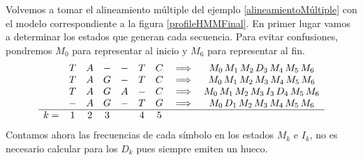 \begin{exampleth}
    Volvemos a tomar el alineamiento múltiple del ejemplo \ref{alineamientoMúltiple} con el modelo correspondiente a la figura \ref{profileHMMFinal}. En primer lugar vamos a determinar los estados que generan cada secuencia. Para evitar confusiones, pondremos $M_0$ para representar al inicio y $M_6$ para representar al fin. 
    \[\begin{array}{c c c c c c c c c}
       & T & A & - & -  & T & C & \implies &  M_0\, M_1\, M_2\,  D_3\,  M_4\,  M_5\,  M_6 \\
       & T & A & G & -  & T & C & \implies &  M_0\,  M_1\,  M_2\,  M_3\,  M_4\,  M_5\,  M_6 \\
       & T & A & G & A  & - & C & \implies &  M_0\,  M_1\,  M_2\,  M_3\,  I_3\,  D_4\,  M_5\,  M_6 \\
       & - & A & G & -  & T & G & \implies &  M_0 \,  D_1 \,  M_2 \,  M_3\,  M_4 \,  M_5 \,  M_6  \\
       \hline
       k= & 1 & 2 & 3 & & 4 & 5 & &
   \end{array}\]   
    Contamos ahora las frecuencias de cada símbolo en los estados $M_k$ e $I_k$, no es necesario calcular para los $D_k$ pues siempre emiten un hueco.


\end{exampleth}
